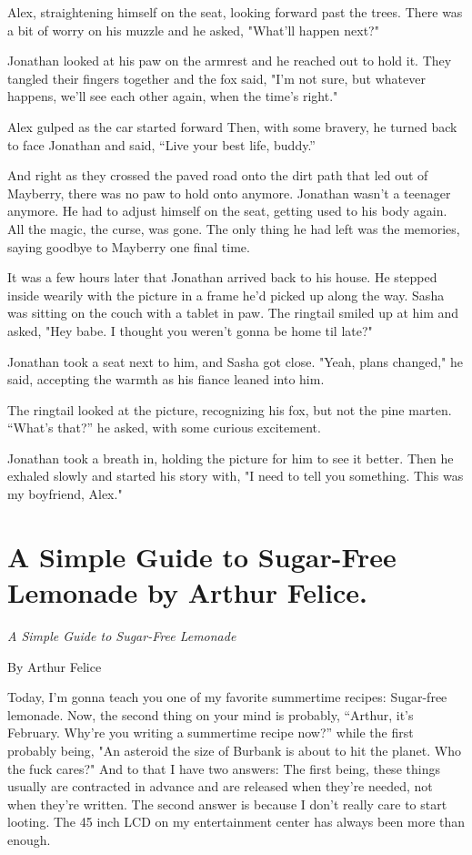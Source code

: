 Alex, straightening himself on the seat, looking forward past the trees.
There was a bit of worry on his muzzle and he asked, "What'll happen
next?"

Jonathan looked at his paw on the armrest and he reached out to hold it.
They tangled their fingers together and the fox said, "I'm not sure, but
whatever happens, we'll see each other again, when the time's right."

Alex gulped as the car started forward Then, with some bravery, he
turned back to face Jonathan and said, ``Live your best life, buddy.''

And right as they crossed the paved road onto the dirt path that led out
of Mayberry, there was no paw to hold onto anymore. Jonathan wasn't a
teenager anymore. He had to adjust himself on the seat, getting used to
his body again. All the magic, the curse, was gone. The only thing he
had left was the memories, saying goodbye to Mayberry one final time.

It was a few hours later that Jonathan arrived back to his house. He
stepped inside wearily with the picture in a frame he'd picked up along
the way. Sasha was sitting on the couch with a tablet in paw. The
ringtail smiled up at him and asked, "Hey babe. I thought you weren't
gonna be home til late?"

Jonathan took a seat next to him, and Sasha got close. "Yeah, plans
changed," he said, accepting the warmth as his fiance leaned into him.

The ringtail looked at the picture, recognizing his fox, but not the
pine marten. ``What's that?'' he asked, with some curious excitement.

Jonathan took a breath in, holding the picture for him to see it better.
Then he exhaled slowly and started his story with, "I need to tell you
something. This was my boyfriend, Alex."

\chapter*{A Simple Guide to Sugar-Free Lemonade by Arthur Felice.}

\emph{A Simple Guide to Sugar-Free Lemonade}

By Arthur Felice

Today, I'm gonna teach you one of my favorite summertime recipes:
Sugar-free lemonade. Now, the second thing on your mind is probably,
``Arthur, it's February. Why're you writing a summertime recipe now?''
while the first probably being, "An asteroid the size of Burbank is
about to hit the planet. Who the fuck cares?" And to that I have two
answers: The first being, these things usually are contracted in advance
and are released when they're needed, not when they're written. The
second answer is because I don't really care to start looting. The 45
inch LCD on my entertainment center has always been more than enough.

